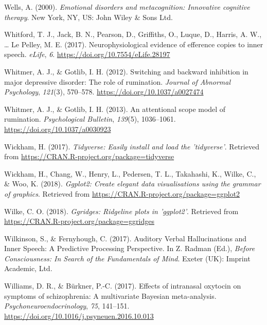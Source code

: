 \documentclass[a4paper,12pt,twoside,openright,oldfontcommands,final]{memoir}
\begin{document}
\leavevmode\hypertarget{ref-wells_emotional_2000}{}%
Wells, A. (2000). \emph{Emotional disorders and metacognition: Innovative cognitive therapy}. New York, NY, US: John Wiley \& Sons Ltd.

\leavevmode\hypertarget{ref-whitford_neurophysiological_2017}{}%
Whitford, T. J., Jack, B. N., Pearson, D., Griffiths, O., Luque, D., Harris, A. W., \ldots{} Le Pelley, M. E. (2017). Neurophysiological evidence of efference copies to inner speech. \emph{eLife}, \emph{6}. \url{https://doi.org/10.7554/eLife.28197}

\leavevmode\hypertarget{ref-whitmer_switching_2012}{}%
Whitmer, A. J., \& Gotlib, I. H. (2012). Switching and backward inhibition in major depressive disorder: The role of rumination. \emph{Journal of Abnormal Psychology}, \emph{121}(3), 570--578. \url{https://doi.org/10.1037/a0027474}

\leavevmode\hypertarget{ref-Whitmer2013}{}%
Whitmer, A. J., \& Gotlib, I. H. (2013). An attentional scope model of rumination. \emph{Psychological Bulletin}, \emph{139}(5), 1036--1061. \url{https://doi.org/10.1037/a0030923}

\leavevmode\hypertarget{ref-R-tidyverse}{}%
Wickham, H. (2017). \emph{Tidyverse: Easily install and load the 'tidyverse'}. Retrieved from \url{https://CRAN.R-project.org/package=tidyverse}

\leavevmode\hypertarget{ref-R-ggplot2}{}%
Wickham, H., Chang, W., Henry, L., Pedersen, T. L., Takahashi, K., Wilke, C., \& Woo, K. (2018). \emph{Ggplot2: Create elegant data visualisations using the grammar of graphics}. Retrieved from \url{https://CRAN.R-project.org/package=ggplot2}

\leavevmode\hypertarget{ref-R-ggridges}{}%
Wilke, C. O. (2018). \emph{Ggridges: Ridgeline plots in 'ggplot2'}. Retrieved from \url{https://CRAN.R-project.org/package=ggridges}

\leavevmode\hypertarget{ref-wilkinson_auditory_2017}{}%
Wilkinson, S., \& Fernyhough, C. (2017). Auditory Verbal Hallucinations and Inner Speech: A Predictive Processing Perspective. In Z. Radman (Ed.), \emph{Before Consciousness: In Search of the Fundamentals of Mind}. Exeter (UK): Imprint Academic, Ltd.

\leavevmode\hypertarget{ref-williams_effects_2017}{}%
Williams, D. R., \& Bürkner, P.-C. (2017). Effects of intranasal oxytocin on symptoms of schizophrenia: A multivariate Bayesian meta-analysis. \emph{Psychoneuroendocrinology}, \emph{75}, 141--151. \url{https://doi.org/10.1016/j.psyneuen.2016.10.013}
\end{document}
